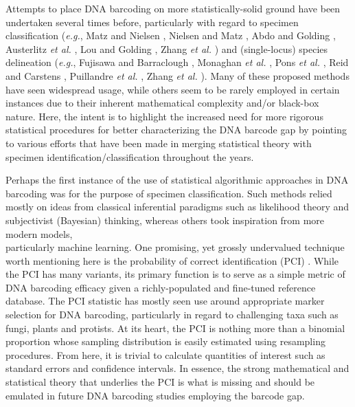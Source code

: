 Attempts to place DNA barcoding on more statistically-solid ground have been \\ undertaken several times before, particularly with regard to specimen classification (\textit{e.g.}, Matz and Nielsen \cite{matz2005likelihood}, Nielsen and Matz \cite{nielsen2006statistical}, Abdo and Golding \cite{abdo2007step}, Austerlitz \textit{et al.} \cite{austerlitz2009dna}, Lou and Golding \cite{lou2010assigning}, Zhang \textit{et al.} \cite{zhang2012fuzzy}) and (single-locus) species delineation (\textit{e.g.}, Fujisawa and Barraclough \cite{fujisawa2013delimiting}, Monaghan \textit{et al.}  \cite{monaghan2009accelerated}, Pons \textit{et al.} \cite{pons2006sequence}, Reid and Carstens \cite{reid2012phylogenetic}, Puillandre \textit{et al.} \cite{puillandre2011abgd}, Zhang \textit{et al.} \cite{zhang2013general}). Many of these proposed methods have seen widespread usage, while others seem to be rarely employed in certain instances due to their inherent mathematical complexity and/or black-box nature. Here, the intent is to highlight the increased need for more rigorous statistical procedures for better characterizing the DNA barcode gap by pointing to various efforts that have been made in merging statistical theory with specimen identification/classification throughout the years.

 

Perhaps the first instance of the use of statistical algorithmic approaches in DNA \\ barcoding was for the purpose of specimen classification. Such methods relied mostly on ideas from classical inferential paradigms such as likelihood theory and subjectivist (Bayesian) thinking, whereas others took inspiration from more modern models, \\ particularly machine learning. One promising, yet grossly undervalued technique worth mentioning here is the probability of correct identification (PCI) \cite{martin2020figures, spouge2012practical}. While the PCI has many variants, its primary function is to serve as a simple metric of DNA barcoding efficacy given a richly-populated and fine-tuned reference database. The PCI statistic has mostly seen use around appropriate marker selection for DNA barcoding, particularly in regard to challenging taxa such as fungi, plants and protists. At its heart, the PCI is nothing more than a binomial proportion whose sampling distribution is easily estimated using resampling procedures. From here, it is trivial to calculate quantities of interest such as standard errors and confidence intervals. In essence, the strong mathematical and statistical theory that underlies the PCI is what is missing and should be emulated in future DNA barcoding studies employing the barcode gap.

